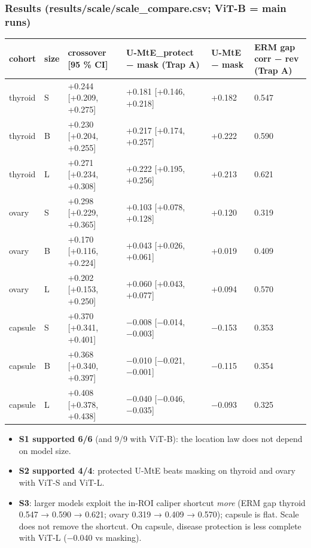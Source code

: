 {\subsubsection{Results (results/scale/scale\_compare.csv; ViT-B = main runs)}\label{results-resultsscalescale_comparecsv-vit-b--main-runs}

{ %
\begin{longtable}[]{@{}llllll@{}}
\toprule\noalign{}
cohort & size & crossover {[}95 \% CI{]} & U-MtE\_protect − mask (Trap A) & U-MtE − mask & ERM gap corr − rev (Trap A) \\
\midrule\noalign{}
\endhead
\bottomrule\noalign{}
\endlastfoot
thyroid & S & +0.244 {[}+0.209, +0.275{]} & +0.181 {[}+0.146, +0.218{]} & +0.182 & 0.547 \\
thyroid & B & +0.230 {[}+0.204, +0.255{]} & +0.217 {[}+0.174, +0.257{]} & +0.222 & 0.590 \\
thyroid & L & +0.271 {[}+0.234, +0.308{]} & +0.222 {[}+0.195, +0.256{]} & +0.213 & 0.621 \\
ovary & S & +0.298 {[}+0.229, +0.365{]} & +0.103 {[}+0.078, +0.128{]} & +0.120 & 0.319 \\
ovary & B & +0.170 {[}+0.116, +0.224{]} & +0.043 {[}+0.026, +0.061{]} & +0.019 & 0.409 \\
ovary & L & +0.202 {[}+0.153, +0.250{]} & +0.060 {[}+0.043, +0.077{]} & +0.094 & 0.570 \\
capsule & S & +0.370 {[}+0.341, +0.401{]} & −0.008 {[}−0.014, −0.003{]} & −0.153 & 0.353 \\
capsule & B & +0.368 {[}+0.340, +0.397{]} & −0.010 {[}−0.021, −0.001{]} & −0.115 & 0.354 \\
capsule & L & +0.408 {[}+0.378, +0.438{]} & −0.040 {[}−0.046, −0.035{]} & −0.093 & 0.325 \\
\end{longtable}
}

\begin{itemize}

\item
  \textbf{S1 supported 6/6} (and 9/9 with ViT-B): the location law does not depend on model size.
\item
  \textbf{S2 supported 4/4}: protected U-MtE beats masking on thyroid and ovary with ViT-S and ViT-L.
\item
  \textbf{S3}: larger models exploit the in-ROI caliper shortcut \emph{more} (ERM gap thyroid 0.547 → 0.590 → 0.621; ovary
  0.319 → 0.409 → 0.570); capsule is flat. Scale does not remove the shortcut. On capsule, disease protection is less
  complete with ViT-L (−0.040 vs masking).
\end{itemize}

}
